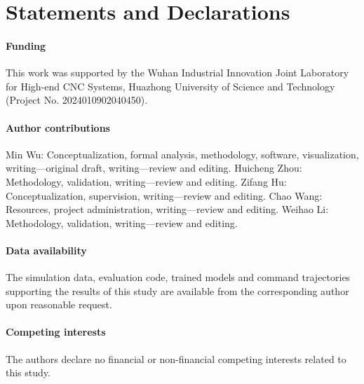 \section*{Statements and Declarations}
\paragraph{Funding}
This work was supported by the Wuhan Industrial Innovation Joint Laboratory for High-end CNC Systems, Huazhong University of Science and Technology (Project No. 2024010902040450).
\paragraph{Author contributions}
Min Wu: Conceptualization, formal analysis, methodology, software, visualization, writing---original draft, writing---review and editing. Huicheng Zhou: Methodology, validation, writing---review and editing. Zifang Hu: Conceptualization, supervision, writing---review and editing. Chao Wang: Resources, project administration, writing---review and editing. Weihao Li: Methodology, validation, writing---review and editing.
\paragraph{Data availability}
The simulation data, evaluation code, trained models and command trajectories supporting the results of this study are available from the corresponding author upon reasonable request.
\paragraph{Competing interests}
The authors declare no financial or non-financial competing interests related to this study.

